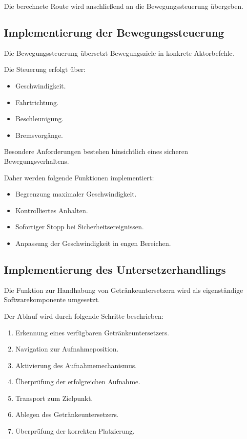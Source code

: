 \documentclass[
  a4paper,
  12pt,
  DIV=12,        %
  parskip=half,  %
  headings=small %
]{scrartcl}
\theoremstyle{definition}
\providecommand{\tightlist}{%
  \setlength{\itemsep}{0pt}\setlength{\parskip}{0pt}}
\theoremstyle{definition}
\begin{document}
Die berechnete Route wird anschließend an die Bewegungssteuerung
übergeben.

\subsection{Implementierung der
Bewegungssteuerung}\label{implementierung-der-bewegungssteuerung}

Die Bewegungssteuerung übersetzt Bewegungsziele in konkrete
Aktorbefehle.

Die Steuerung erfolgt über:

\begin{itemize}
\tightlist
\item
  Geschwindigkeit.
\item
  Fahrtrichtung.
\item
  Beschleunigung.
\item
  Bremsvorgänge.
\end{itemize}

Besondere Anforderungen bestehen hinsichtlich eines sicheren
Bewegungsverhaltens.

Daher werden folgende Funktionen implementiert:

\begin{itemize}
\tightlist
\item
  Begrenzung maximaler Geschwindigkeit.
\item
  Kontrolliertes Anhalten.
\item
  Sofortiger Stopp bei Sicherheitsereignissen.
\item
  Anpassung der Geschwindigkeit in engen Bereichen.
\end{itemize}

\subsection{Implementierung des
Untersetzerhandlings}\label{implementierung-des-untersetzerhandlings}

Die Funktion zur Handhabung von Getränkeuntersetzern wird als
eigenständige Softwarekomponente umgesetzt.

Der Ablauf wird durch folgende Schritte beschrieben:

\begin{enumerate}
\def\labelenumi{\arabic{enumi}.}
\tightlist
\item
  Erkennung eines verfügbaren Getränkeuntersetzers.
\item
  Navigation zur Aufnahmeposition.
\item
  Aktivierung des Aufnahmemechanismus.
\item
  Überprüfung der erfolgreichen Aufnahme.
\item
  Transport zum Zielpunkt.
\item
  Ablegen des Getränkeuntersetzers.
\item
  Überprüfung der korrekten Platzierung.
\end{enumerate}
\end{document}
